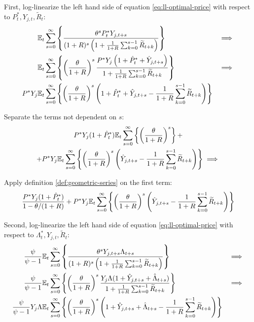 \documentclass[
	thesis.tex
	]{subfiles}
\begin{document}
First, log-linearize the left hand side of equation \ref{eq:ll-optimal-price} with respect to \( P_t^\ast, Y_{j,t}, \widetilde{R}_t \):
\begin{alignat}{2}
	& {\mathbb{E}_{t}} \sum_{s=0}^{\infty} \left\{ \frac{\theta^s P_t^\ast Y_{j,t+s}}{ (1 + R)^s \left( 1 + \frac{1}{1 + R} \sum_{k=0}^{s-1} \widetilde{R}_{t+k} \right) } \right\} &\implies \nonumber \\
	& {\mathbb{E}_{t}} \sum_{s=0}^{\infty} \left\{ \left( \frac{\theta}{1 + R} \right)^s  \frac{ P^\ast Y_{j} \left( 1 + \hat{P}_t^\ast + \hat{Y}_{j,t+s} \right) }{ 1 + \frac{1}{1 + R} \sum_{k=0}^{s-1} \widetilde{R}_{t+k} } \right\} &\implies \nonumber \\
	P^\ast Y_{j} &{\mathbb{E}_{t}} \sum_{s=0}^{\infty} \left\{ \left( \frac{\theta}{1 + R} \right)^s \left( 1 + \hat{P}_t^\ast + \hat{Y}_{j,t+s} - \frac{1}{1 + R} \sum_{k=0}^{s-1} \widetilde{R}_{t+k} \right) \right\} & \nonumber
\end{alignat}

Separate the terms not dependent on $s$:
\begin{multline}
	P^\ast Y_{j} ( 1 + \hat{P}_t^\ast ) {\mathbb{E}_{t}} \sum_{s=0}^{\infty} \left\{ \left( \frac{\theta}{1 + R} \right)^s \right\} + \\
	+ P^\ast Y_{j} {\mathbb{E}_{t}} \sum_{s=0}^{\infty} \left\{ \left( \frac{\theta}{1 + R} \right)^s \left( \hat{Y}_{j,t+s} - \frac{1}{1 + R} \sum_{k=0}^{s-1} \widetilde{R}_{t+k} \right) \right\} \implies \nonumber
\end{multline}

Apply definition \ref{def:geometric-series} on the first term:
\begin{align}
	\frac{ P^\ast Y_{j} ( 1 + \hat{P}_t^\ast ) }{1-\theta /(1+R)} + P^\ast Y_{j} {\mathbb{E}_{t}} \sum_{s=0}^{\infty} \left\{ \left( \frac{\theta}{1 + R} \right)^s \left( \hat{Y}_{j,t+s} - \frac{1}{1 + R} \sum_{k=0}^{s-1} \widetilde{R}_{t+k} \right) \right\} \nonumber
\end{align}

Second, log-linearize the left hand side of equation \ref{eq:ll-optimal-price} with respect to \( \Lambda_t^\ast, Y_{j,t}, \widetilde{R}_t \):
\begin{alignat}{2}
	\frac{\psi}{\psi-1} &{\mathbb{E}_{t}} \sum_{s=0}^{\infty} \left\{ \frac{\theta^s Y_{j,t+s} \Lambda_{t+s}}{ (1 + R)^s \left( 1 + \frac{1}{1 + R} \sum_{k=0}^{s-1} \widetilde{R}_{t+k} \right) } \right\} & \implies \nonumber \\
	\frac{\psi}{\psi-1} &{\mathbb{E}_{t}} \sum_{s=0}^{\infty} \left\{ \left( \frac{\theta}{1 + R} \right)^s \frac{ Y_{j} \Lambda (1+ \hat{Y}_{j,t+s} + \hat{\Lambda}_{t+s}) }{ 1 + \frac{1}{1 + R} \sum_{k=0}^{s-1} \widetilde{R}_{t+k} } \right\} & \implies \nonumber \\
	\frac{\psi}{\psi-1} Y_{j} \Lambda &{\mathbb{E}_{t}} \sum_{s=0}^{\infty} \left\{ \left( \frac{\theta}{1 + R} \right)^s \left( 1+ \hat{Y}_{j,t+s} + \hat{\Lambda}_{t+s} - \frac{1}{1 + R} \sum_{k=0}^{s-1} \widetilde{R}_{t+k} \right) \right\} & \nonumber
\end{alignat}
\end{document}
